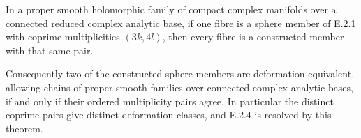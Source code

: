 \begin{theorem}
In a proper smooth holomorphic family of compact complex
manifolds over a connected reduced complex analytic base,
if one fibre is a sphere member of E.2.1 with coprime
multiplicities $(3k,4l)$, then every fibre is a constructed
member with that same pair.

Consequently two of the constructed sphere members are
deformation equivalent, allowing chains of proper smooth
families over connected complex analytic bases, if and
only if their ordered multiplicity pairs agree.  In
particular the distinct coprime pairs give distinct
deformation classes, and E.2.4 is resolved by this theorem.
\end{theorem}
